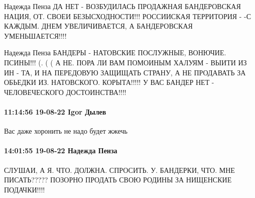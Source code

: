 Надежда Пенза
ДА НЕТ - ВОЗБУДИЛАСЬ ПРОДАЖНАЯ БАНДЕРОВСКАЯ НАЦИЯ, ОТ. СВОЕИ БЕЗЫСХОДНОСТИ!!!
РОССИИСКАЯ ТЕРРИТОРИЯ - -С КАЖДЫМ. ДНЕМ УВЕЛИЧИВАЕТСЯ, А БАНДЕРОВСКАЯ УМЕНЬШАЕТСЯ!!!!

Надежда Пенза
БАНДЕРЫ - НАТОВСКИЕ ПОСЛУЖНЫЕ, ВОНЮЧИЕ. ПСИНЫ!!! (. ( ( А НЕ. ПОРА ЛИ ВАМ ПОМОИНЫМ ХАЛУЯМ - ВЫИТИ ИЗ ИН - ТА, И НА ПЕРЕДОВУЮ ЗАЩИЩАТЬ СТРАНУ, А НЕ ПРОДАВАТЬ ЗА ОБЬЕДКИ ИЗ. НАТОВСКОГО. КОРЫТА!!!!! У ВАС БАНДЕР НЕТ - ЧЕЛОВЕЧЕСКОГО ДОСТОИНСТВА!!!!

\paragraph{11:14:56 19-08-22 Igor Дылев}

Вас даже хоронить не надо будет жжечь

\paragraph{14:01:55 19-08-22 Надежда Пенза}

СЛУШАИ, А Я. ЧТО. ДОЛЖНА. СПРОСИТЬ. У. БАНДЕРКИ, ЧТО. МНЕ ПИСАТЬ????? ПОЗОРНО
ПРОДАТЬ СВОЮ РОДИНЫ ЗА НИЩЕНСКИЕ ПОДАЧКИ!!!!
